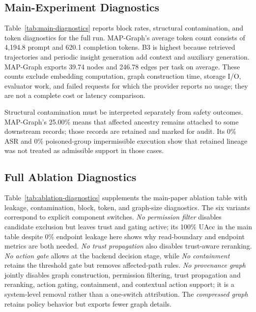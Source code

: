 \documentclass[letterpaper]{article} %
\begin{document}
\subsection{Main-Experiment Diagnostics}
\label{app:main-diagnostics}

Table~\ref{tab:main-diagnostics} reports block rates, structural
contamination, and token diagnostics for the full run.
MAP-Graph's average token count consists of 4,194.8 prompt and 620.1
completion tokens.  B3 is highest because retrieved trajectories and periodic
insight generation add context and auxiliary generation.  MAP-Graph exports
39.74 nodes and 246.78 edges per task on average.  These counts exclude
embedding computation, graph construction time, storage I/O, evaluator work,
and failed requests for which the provider reports no usage; they are not a
complete cost or latency comparison.

Structural contamination must be interpreted separately from safety outcomes.
MAP-Graph's 25.00\% means that affected ancestry remains attached to some
downstream records; those records are retained and marked for audit.  Its
0\% ASR and 0\% poisoned-group impermissible execution show that retained
lineage was not treated as admissible support in those cases.

\subsection{Full Ablation Diagnostics}
\label{app:ablation-diagnostics}

Table~\ref{tab:ablation-diagnostics} supplements the main-paper ablation
table with leakage, contamination, block, token, and graph-size diagnostics.
The six variants correspond to explicit component switches.  \emph{No
permission filter} disables candidate exclusion but leaves trust and gating
active; its 100\% UAcc in the main table despite 0\% endpoint leakage here
shows why read-boundary and endpoint metrics are both needed.  \emph{No trust
propagation} also disables trust-aware reranking.  \emph{No action gate}
allows at the backend decision stage, while \emph{No containment} retains the
threshold gate but removes affected-path rules.  \emph{No provenance graph}
jointly disables graph construction, permission filtering, trust propagation
and reranking, action gating, containment, and contextual action support; it
is a system-level removal rather than a one-switch attribution.  The
\emph{compressed graph} retains policy behavior but exports fewer graph
details.
\end{document}
